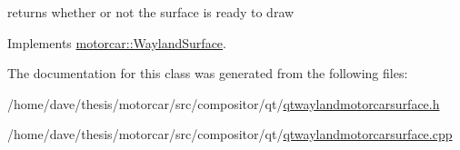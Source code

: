 returns whether or not the surface is ready to draw 



Implements \hyperlink{classmotorcar_1_1WaylandSurface_af2f54076ec690f4d478771183c9b0db5}{motorcar\-::\-Wayland\-Surface}.



The documentation for this class was generated from the following files\-:\begin{DoxyCompactItemize}
\item 
/home/dave/thesis/motorcar/src/compositor/qt/\hyperlink{qtwaylandmotorcarsurface_8h}{qtwaylandmotorcarsurface.\-h}\item 
/home/dave/thesis/motorcar/src/compositor/qt/\hyperlink{qtwaylandmotorcarsurface_8cpp}{qtwaylandmotorcarsurface.\-cpp}\end{DoxyCompactItemize}

